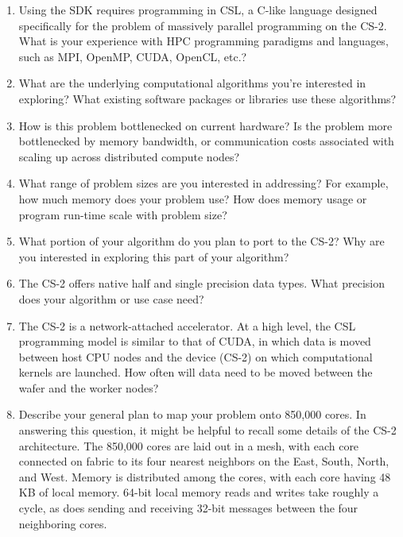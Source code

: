 \begin{displayquote} \itshape
    \begin{enumerate}
    \item Using the SDK requires programming in CSL, a C-like language designed specifically for the problem of massively parallel programming on the CS-2.
    What is your experience with HPC programming paradigms and languages, such as MPI, OpenMP, CUDA, OpenCL, etc.?
    \item What are the underlying computational algorithms you're interested in exploring?
    What existing software packages or libraries use these algorithms?
    \item How is this problem bottlenecked on current hardware?
    Is the problem more bottlenecked by memory bandwidth, or communication costs associated with scaling up across distributed compute nodes?
    \item What range of problem sizes are you interested in addressing?
    For example, how much memory does your problem use?
    How does memory usage or program run-time scale with problem size?
    \item What portion of your algorithm do you plan to port to the CS-2?
    Why are you interested in exploring this part of your algorithm?
    \item The CS-2 offers native half and single precision data types.
    What precision does your algorithm or use case need?
    \item The CS-2 is a network-attached accelerator. At a high level, the CSL programming model is similar to that of CUDA, in which data is moved between host CPU nodes and the device (CS-2) on which computational kernels are launched.
    How often will data need to be moved between the wafer and the worker nodes?
    \item Describe your general plan to map your problem onto 850,000 cores. In answering this question, it might be helpful to recall some details of the CS-2 architecture.
    The 850,000 cores are laid out in a mesh, with each core connected on fabric to its four nearest neighbors on the East, South, North, and West.
    Memory is distributed among the cores, with each core having 48 KB of local memory.
    64-bit local memory reads and writes take roughly a cycle, as does sending and receiving 32-bit messages between the four neighboring cores.
    \end{enumerate}
\end{displayquote}

